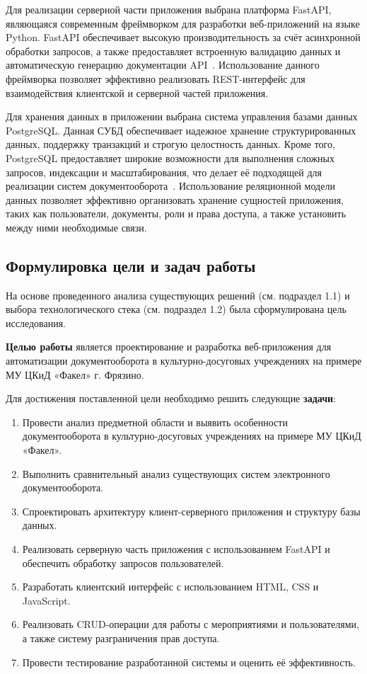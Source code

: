 Для реализации серверной части приложения выбрана платформа FastAPI, являющаяся современным фреймворком для разработки веб-приложений на языке Python. FastAPI обеспечивает высокую производительность за счёт асинхронной обработки запросов, а также предоставляет встроенную валидацию данных и автоматическую генерацию документации API~\cite{fastapi_docs}. Использование данного фреймворка позволяет эффективно реализовать REST-интерфейс для взаимодействия клиентской и серверной частей приложения.

Для хранения данных в приложении выбрана система управления базами данных PostgreSQL. Данная СУБД обеспечивает надежное хранение структурированных данных, поддержку транзакций и строгую целостность данных. Кроме того, PostgreSQL предоставляет широкие возможности для выполнения сложных запросов, индексации и масштабирования, что делает её подходящей для реализации систем документооборота~\cite{postgres_docs}. Использование реляционной модели данных позволяет эффективно организовать хранение сущностей приложения, таких как пользователи, документы, роли и права доступа, а также установить между ними необходимые связи.

\subsection{Формулировка цели и задач работы}

На основе проведенного анализа существующих решений (см. подраздел 1.1) и выбора технологического стека (см. подраздел 1.2) была сформулирована цель исследования.

\textbf{Целью работы} является проектирование и разработка веб-приложения для автоматизации документооборота в культурно-досуговых учреждениях на примере МУ ЦКиД «Факел» г. Фрязино.

Для достижения поставленной цели необходимо решить следующие \textbf{задачи}:
\begin{enumerate}
\item Провести анализ предметной области и выявить особенности документооборота в культурно-досуговых учреждениях на примере МУ ЦКиД «Факел».
\item Выполнить сравнительный анализ существующих систем электронного документооборота.
\item Спроектировать архитектуру клиент-серверного приложения и структуру базы данных.
\item Реализовать серверную часть приложения с использованием FastAPI и обеспечить обработку запросов пользователей.
\item Разработать клиентский интерфейс с использованием HTML, CSS и JavaScript.
\item Реализовать CRUD-операции для работы с мероприятиями и пользователями, а также систему разграничения прав доступа.
\item Провести тестирование разработанной системы и оценить её эффективность.
\end{enumerate}